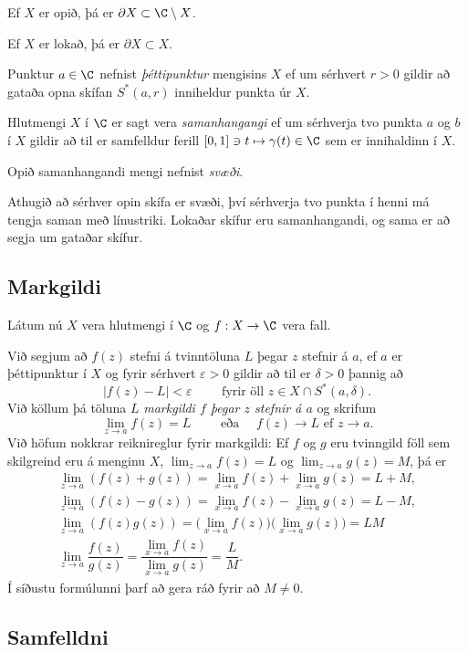 Ef $X$ er opið, þá er $\partial X\subset \C\setminus X$.

Ef $X$ er lokað, þá er $\partial X\subset X$.   

Punktur $a\in \C$ nefnist {\it þéttipunktur} mengisins $X$ ef um
sérhvert $r>0$ gildir að gataða opna skífan $S^*(a,r)$ inniheldur
punkta úr $X$.  


Hlutmengi $X$ í $\C$ er sagt vera
{\it samanhangangi} ef um sérhverja tvo punkta $a$ og $b$ í 
$X$ gildir að til er samfelldur ferill  
$[0,1]\ni t\mapsto \gamma(t)\in \C$ sem er
innihaldinn í $X$.   

Opið samanhangandi mengi nefnist {\it svæði}.  


Athugið að sérhver opin skífa er svæði, því sérhverja tvo punkta í
henni má
tengja saman með línustriki.  Lokaðar skífur eru samanhangandi,
og sama er að segja um gataðar skífur.


\subsection*{Markgildi}

Látum nú $X$ vera hlutmengi í $\C$ og $f:X\to \C$ vera fall.  

Við segjum að $f(z)$ stefni á tvinntöluna $L$ þegar  $z$ stefnir á
$a$,  ef $a$ er
þéttipunktur í $X$ og fyrir sérhvert $\varepsilon>0$ gildir að til er
$\delta>0$ þannig að 
$$
|f(z)-L|<\varepsilon \qquad \text{ fyrir öll } z\in X\cap S^*(a,\delta).
$$
Við köllum þá töluna $L$ {\it markgildi $f$ þegar $z$ stefnir á $a$}
og skrifum 
$$
\lim_{z\to a}f(z)=L  \qquad \text{ eða } \quad f(z)\to L \text{ ef }
z\to a.
$$
Við höfum nokkrar reiknireglur fyrir markgildi:  Ef $f$ og $g$ eru
tvinngild föll sem skilgreind eru á menginu $X$, $\lim_{z\to a}f(z)=L$
og $\lim_{z\to a}g(z)=M$, þá er 
\begin{gather*}
\lim_{z\to a}(f(z)+g(z))=\lim_{x\to a}f(z)+\lim_{x\to a}g(z)=L+M,\\
\lim_{z\to a}(f(z)-g(z))=\lim_{x\to a}f(z)-\lim_{x\to a}g(z)=L-M,\\
\lim_{z\to a}(f(z)g(z))=\big(\lim_{x\to a}f(z)\big)\big(\lim_{x\to
a}g(z)\big)=LM\\
\lim_{z\to a}\dfrac{f(z)}{g(z)}=\dfrac{\lim_{x\to a}f(z)}{\lim_{x\to
a}g(z)}=\dfrac LM.
\end{gather*}
Í síðustu formúlunni þarf að gera ráð fyrir að $M\neq 0$.



\subsection*{Samfelldni}

